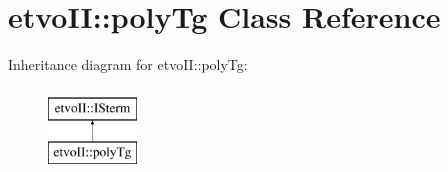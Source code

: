\hypertarget{classetvo_i_i_1_1poly_tg}{}\section{etvo\+II\+:\+:poly\+Tg Class Reference}
\label{classetvo_i_i_1_1poly_tg}
Inheritance diagram for etvo\+II\+:\+:poly\+Tg\+:\begin{figure}[H]
\begin{center}
\leavevmode
\includegraphics[height=2.000000cm]{classetvo_i_i_1_1poly_tg}
\end{center}
\end{figure}
